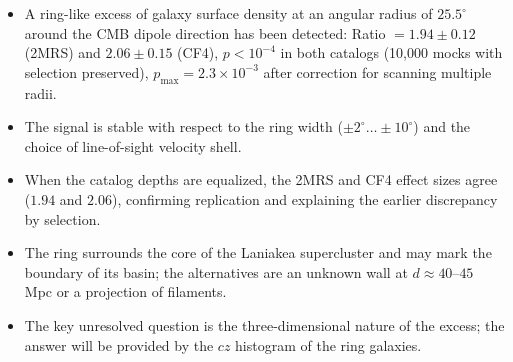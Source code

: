 \documentclass[11pt,a4paper]{article}
\begin{document}
\begin{itemize}
\item A ring-like excess of galaxy surface density at an angular radius of
\(25.5^\circ\) around the CMB dipole direction has been detected:
Ratio \(= 1.94 \pm 0.12\) (2MRS) and \(2.06 \pm 0.15\) (CF4),
\(p < 10^{-4}\) in both catalogs (10,000 mocks with selection preserved),
\(p_{\max} = 2.3 \times 10^{-3}\) after correction for scanning multiple radii.
\item The signal is stable with respect to the ring width
(\(\pm 2^\circ \dots \pm 10^\circ\)) and the choice of line-of-sight velocity shell.
\item When the catalog depths are equalized, the 2MRS and CF4 effect sizes agree
(\(1.94\) and \(2.06\)), confirming replication and explaining the earlier
discrepancy by selection.
\item The ring surrounds the core of the Laniakea supercluster and may mark
the boundary of its basin; the alternatives are an unknown wall at
\(d \approx 40\)--\(45\) Mpc or a projection of filaments.
\item The key unresolved question is the three-dimensional nature of the excess;
the answer will be provided by the \(cz\) histogram of the ring galaxies.
\end{itemize}
\end{document}
